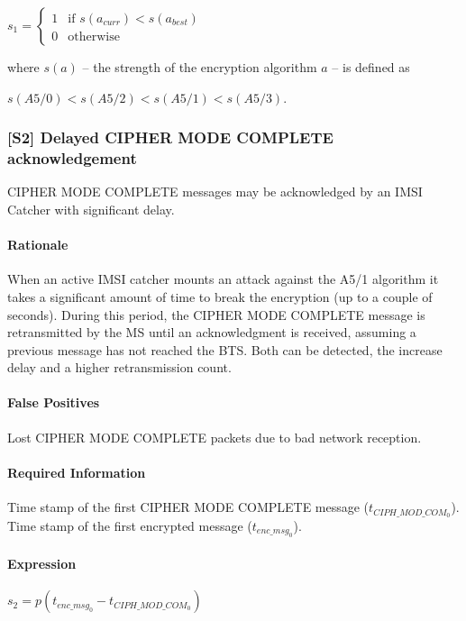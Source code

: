 \documentclass[a4paper,11pt,notitlepage,bigheadings,oneside]{scrartcl}
\begin{document}
$s_1 =
\begin{cases}
	1 & \text{if } s(a_{curr}) < s(a_{best}) \\
	0 & \text{otherwise}
\end{cases}$

where $s(a)$ -- the strength of the encryption algorithm $a$ -- is defined as

$s(A5/0) < s(A5/2) < s(A5/1) < s(A5/3)$.

\subsubsection{[S2] Delayed CIPHER MODE COMPLETE acknowledgement}

CIPHER MODE COMPLETE messages may be acknowledged by an IMSI Catcher with
significant delay.

\paragraph{Rationale}

When an active IMSI catcher mounts an attack against the A5/1 algorithm it
takes a significant amount of time to break the encryption (up to a couple of
seconds). During this period, the CIPHER MODE COMPLETE message is retransmitted
by the MS until an acknowledgment is received, assuming a previous message has
not reached the BTS. Both can be detected, the increase delay and a higher
retransmission count.

\paragraph{False Positives}

Lost CIPHER MODE COMPLETE packets due to bad network reception.

\paragraph{Required Information}

Time stamp of the first CIPHER MODE COMPLETE message ($t_{CIPH\_MOD\_COM_0}$).
Time stamp of the first encrypted message ($t_{enc\_msg_0}$).

\paragraph{Expression}

$s_2 = p(t_{enc\_msg_0} - t_{CIPH\_MOD\_COM_0})$
\end{document}

